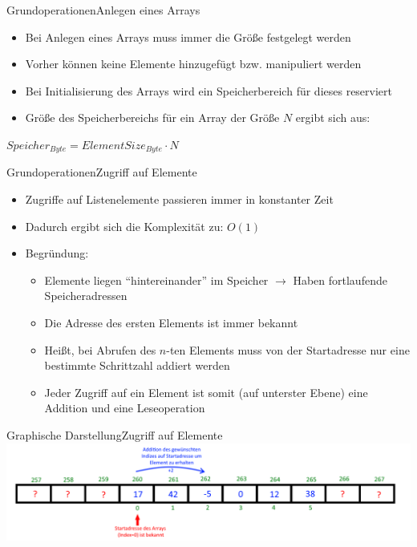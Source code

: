 \begin{frame}{Grundoperationen}{Anlegen eines Arrays}
	\begin{itemize}
		\item Bei Anlegen eines Arrays muss immer die Größe festgelegt werden
		\item Vorher können keine Elemente hinzugefügt bzw. manipuliert werden
		\item Bei Initialisierung des Arrays wird ein Speicherbereich für dieses reserviert
		\item Größe des Speicherbereichs für ein Array der Größe $N$ ergibt sich aus:
	\end{itemize}
	$Speicher_{Byte}=ElementSize_{Byte}\cdot N$
\end{frame}

\begin{frame}{Grundoperationen}{Zugriff auf Elemente}
	\begin{itemize}
		\item Zugriffe auf Listenelemente passieren immer in konstanter Zeit
		\item Dadurch ergibt sich die Komplexität zu: $O(1)$
		\item Begründung:
		\begin{itemize}
			\item Elemente liegen "`hintereinander"' im Speicher $\rightarrow$ Haben fortlaufende Speicheradressen
			\item Die Adresse des ersten Elements ist immer bekannt
			\item Heißt, bei Abrufen des $n$-ten Elements muss von der Startadresse nur eine bestimmte Schrittzahl addiert werden
			\item Jeder Zugriff auf ein Element ist somit (auf unterster Ebene) eine Addition und eine Leseoperation
		\end{itemize}
	\end{itemize}
\end{frame}


\begin{frame}{Graphische Darstellung}{Zugriff auf Elemente}
\includegraphics[width=\textwidth]{graph/array_access}
\end{frame}

